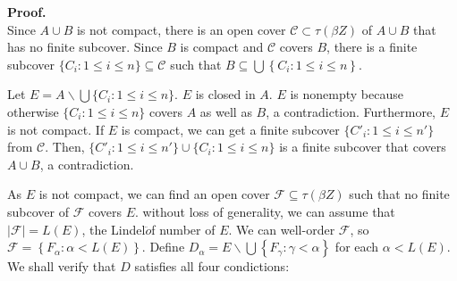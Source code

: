 \documentclass{article}
\begin{document}
			  \textbf{Proof.} \\
			      Since $A\cup B $ is not compact, there is an open cover $\mathcal{C} \subset \tau(\beta Z)$ of $A\cup B$ that has no finite subcover.  Since $B$ is compact and $\mathcal{C}$ covers $B$, there is a finite subcover $\{C_i:1\leq i \leq n\}\subseteq \mathcal{C}$ such that $B\subseteq  \bigcup\left\{C_i:1\leq i \leq n\right\}$.
			      \vskip 10pt

			      Let $E=A\backslash \bigcup \{C_i:1\leq i \leq n\}$. $E$ is closed in $A$. $E$ is nonempty because otherwise $\{C_i:1\leq i \leq n\}$ covers $A$ as well as $B$, a contradiction. Furthermore, $E$ is not compact. If $E$ is compact, we can get a finite subcover $\{C'_i:1\leq i\leq n'\}$ from $\mathcal{C}$. Then, $\{C'_i:1\leq i\leq n'\} \cup \{C_i:1\leq i \leq n\}$ is a finite subcover that covers $A\cup B$, a contradiction. 


			      \vskip 10pt


			      As $E$ is not compact, we can find an open cover $\mathcal{F}\subseteq \tau(\beta Z)$ such that no finite subcover of $\mathcal{F}$ covers $E$. 
			      without loss of generality, we can assume that $|\mathcal{F}|=L(E)$, the Lindel$\ddot{o}$f number of $E$. We can well-order $\mathcal{F}$, so $\mathcal{F}=\left\{F_\alpha: \alpha<L(E)\right\}$.
			      Define $D_\alpha=E\backslash \bigcup \left\{F_\gamma: \gamma<\alpha\right\}$ for each $\alpha < L(E)$. We shall verify that $D$ satisfies all four condictions:
\end{document}
